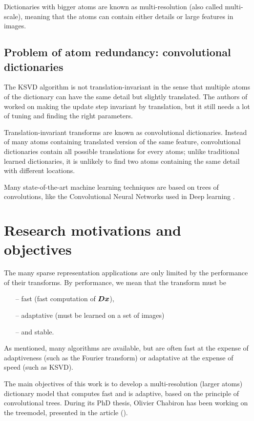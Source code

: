 Dictionaries with bigger atoms are known as multi-resolution (also called multi-scale), meaning that the atoms can contain either details or large features in images.


\subsection{Problem of atom redundancy: convolutional dictionaries} \label{sec_atoms_redund}
The \ac{KSVD} algorithm is not translation-invariant in the sense that multiple atoms of the dictionary can have the same detail but slightly translated. The authors of \cite{mailhe_shift-invariant_2008} worked on making the update step invariant by translation, but it still needs a lot of tuning and finding the right parameters.

Translation-invariant transforms are known as convolutional dictionaries. Instead of many atoms containing translated version of the same feature, convolutional dictionaries contain all possible translations for every atoms; unlike traditional learned dictionaries, it is unlikely to find two atoms containing the same detail with different locations.

Many state-of-the-art machine learning techniques are based on trees of convolutions, like the Convolutional Neural Networks used in Deep learning \cite{lecun_deep_2015}.

\section{Research motivations and objectives}
 The many sparse representation applications are only limited by the performance of their transforms. By performance, we mean that the transform must be
\begin{itemize}
\item[--] fast (fast computation of $\bm{D}\bm{x}$),
\item[--] adaptative (must be learned on a set of images)
\item[--] and stable.
\end{itemize}

As mentioned, many algorithms are available, but are often fast at the expense of adaptiveness (such as the Fourier transform) or adaptative at the expense of speed (such as \ac{KSVD}).

The main objectives of this work is to develop a multi-resolution (larger atoms) dictionary model that computes fast and is adaptive, based on the principle of convolutional trees. During its PhD thesis, Olivier Chabiron has been working on the \Gls{treemodel}, presented in the article  (\cite{chabiron_optimization_2016}). 


